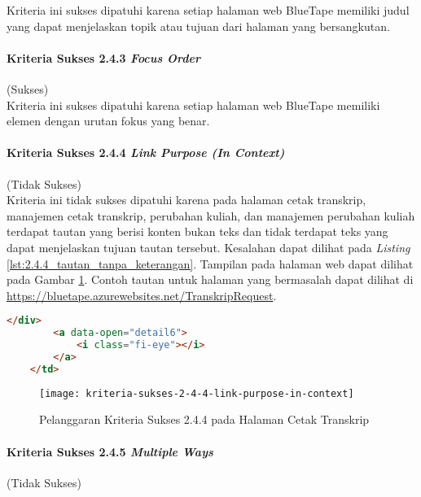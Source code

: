 Kriteria ini sukses dipatuhi karena setiap halaman web BlueTape memiliki judul yang dapat menjelaskan topik atau tujuan dari halaman yang bersangkutan.

\paragraph{Kriteria Sukses 2.4.3 \textit{Focus Order}}
\label{par:kepatuhan_bluetape_kriteria_sukses_2.4.3}
(Sukses)\\

Kriteria ini sukses dipatuhi karena setiap halaman web BlueTape memiliki elemen dengan urutan fokus yang benar. 

\paragraph{Kriteria Sukses 2.4.4 \textit{Link Purpose (In Context)}}
\label{par:kepatuhan_bluetape_kriteria_sukses_2.4.4}
(Tidak Sukses)\\

Kriteria ini tidak sukses dipatuhi karena pada halaman cetak transkrip, manajemen cetak transkrip, perubahan kuliah, dan manajemen perubahan kuliah terdapat tautan yang berisi konten bukan teks dan tidak terdapat teks yang dapat menjelaskan tujuan tautan tersebut. Kesalahan dapat dilihat pada \textit{Listing} \ref{lst:2.4.4_tautan_tanpa_keterangan}. Tampilan pada halaman web dapat dilihat pada Gambar \ref{fig:2.4.4_link_purpose_in_context}. Contoh tautan untuk halaman yang bermasalah dapat dilihat di \url{https://bluetape.azurewebsites.net/TranskripRequest}.

\begin{lstlisting}[frame=single, label={lst:2.4.4_tautan_tanpa_keterangan}, language=HTML, caption=Pelanggaran Kriteria Sukses 2.4.4 pada Halaman Cetak Transkrip]
        </div>
        <a data-open="detail6">
            <i class="fi-eye"></i>
        </a>
    </td>
\end{lstlisting}

\begin{figure}[H]
    \centering  
    \texttt{[image: kriteria-sukses-2-4-4-link-purpose-in-context]}  
    \caption[Pelanggaran Kriteria Sukses 2.4.4 pada Halaman Cetak Transkrip]{Pelanggaran Kriteria Sukses 2.4.4 pada Halaman Cetak Transkrip}
    \label{fig:2.4.4_link_purpose_in_context}  
\end{figure} 

\paragraph{Kriteria Sukses 2.4.5 \textit{Multiple Ways}}
\label{par:kepatuhan_bluetape_kriteria_sukses_2.4.5}
(Tidak Sukses)\\

